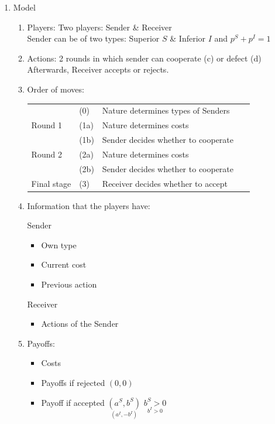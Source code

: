 \documentclass[11pt]{article}
\theoremstyle{plainCl1}
\begin{document}
\begin{enumerate}[label={(\alph*)}]
\item Model
	\begin{enumerate}[label={(\arabic*)}]
    	\item Players: Two players: Sender \& Receiver\\
		Sender can be of two types: Superior $S$ \& Inferior $I$ and $p^S + p^I = 1 $
    	\item Actions: 2 rounds in which sender can cooperate (c) or defect (d)\\
		Afterwards, Receiver accepts or rejects.
   	\item Order of moves: 
		\begin{table}[h]
		\centering
		\begin{tabular}{llll}
		            & (0)  & Nature determines types of Senders   &   \\
		Round 1     & (1a) & Nature determines costs              &   \\
		            & (1b) & Sender decides whether to cooperate~ &   \\
		Round 2     & (2a) & Nature determines costs              &   \\
		            & (2b) & Sender decides whether to cooperate  &   \\
		Final stage & (3)  & Receiver decides whether to accept   &  
		\end{tabular}
		\end{table}
	\item Information that the players have:
		\begin{multicols}{2}
		Sender
		\begin{itemize}
		\item Own type
		\item Current cost
		\item Previous action
		\end{itemize}
		\columnbreak
		Receiver
		\begin{itemize}
		\item Actions of the Sender
		\end{itemize}
		\end{multicols}
		\item Payoffs:
			\begin{itemize}
			\item Costs
			\item Payoffs if rejected \quad $(0,0)$
			\item Payoff if accepted \quad  $\underset{(a^I, -b^I) }{(a^S, b^S)}$ \quad $\underset{b^I > 0}{b^S > 0}$

\end{itemize}
\end{enumerate}
\end{enumerate}
\end{document}
